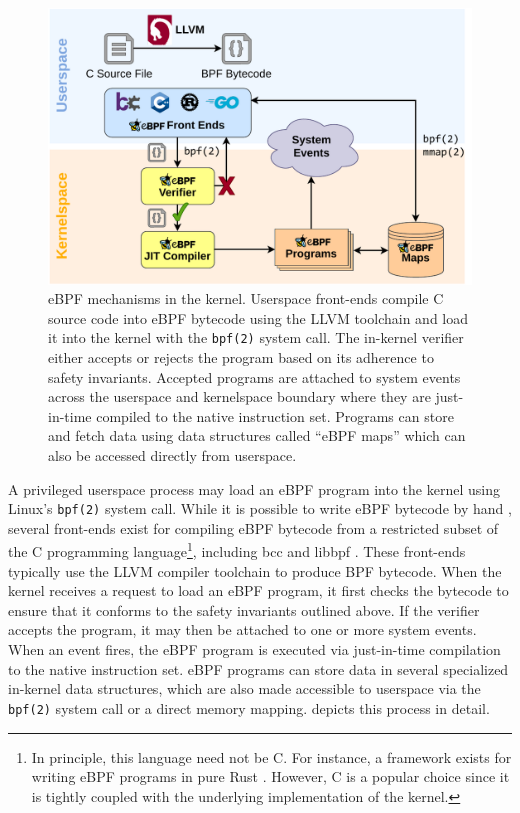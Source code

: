 \begin{figure}[htpb]
  \centering
  \includegraphics[width=0.8\linewidth]{figs/ebpf.pdf}
  \caption{
    eBPF mechanisms in the kernel. Userspace front-ends compile C source code into eBPF bytecode using the LLVM toolchain and load it into the kernel with the \texttt{bpf(2)} system call. The in-kernel verifier either accepts or rejects the program based on its adherence to safety invariants. Accepted programs are attached to system events across the userspace and kernelspace boundary where they are just-in-time compiled to the native instruction set. Programs can store and fetch data using data structures called \enquote{eBPF maps} which can also be accessed directly from userspace.
  }%
  \label{fig:ebpf}
\end{figure}

A privileged userspace process may load an eBPF program into the kernel using Linux's \texttt{bpf(2)} system call. While it is possible to write eBPF bytecode by hand \cite{gregg2019_bpf}, several front-ends exist for compiling eBPF bytecode from a restricted subset of the C programming language\footnote{In principle, this language need not be C. For instance, a framework exists for writing eBPF programs in pure Rust \cite{redbpf}. However, C is a popular choice since it is tightly coupled with the underlying implementation of the kernel.}, including bcc \cite{bcc} and libbpf \cite{libbpf}. These front-ends typically use the LLVM \cite{llvm_bpf} compiler toolchain to produce BPF bytecode. When the kernel receives a request to load an eBPF program, it first checks the bytecode to ensure that it conforms to the safety invariants outlined above. If the verifier accepts the program, it may then be attached to one or more system events. When an event fires, the eBPF program is executed via just-in-time compilation to the native instruction set. eBPF programs can store data in several specialized in-kernel data structures, which are also made accessible to userspace via the \texttt{bpf(2)} system call or a direct memory mapping.  depicts this process in detail.

